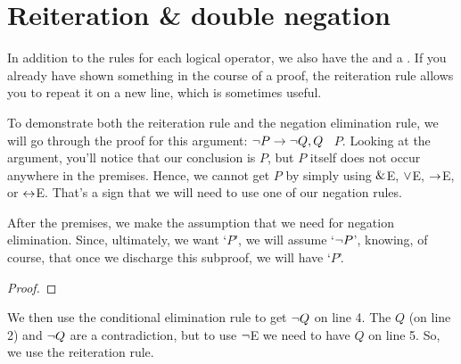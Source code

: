 

\section{Reiteration \& double negation}
In addition to the rules for each logical operator, we also have the  and a . If you already have shown something in the course of a proof, the reiteration rule allows you to repeat it on a new line, which is sometimes useful.  


To demonstrate both the reiteration rule and the negation elimination rule, we will go through the proof for this argument: ${\neg} P \rightarrow {\neg} Q, Q$ \therefore\ $P$. Looking at the argument, you'll notice that our conclusion is $P$, but $P$ itself does not occur anywhere in the premises. Hence, we cannot get $P$ by simply using $\mathbin{\&}$E, $\vee$E, $\rightarrow$E, or $\leftrightarrow$E. That's a sign that we will need to use one of our negation rules.

After the premises, we make the assumption that we need for negation elimination. Since, ultimately, we want `$P$', we will assume `${\neg} P$', knowing, of course, that once we discharge this subproof, we will have `$P$'.

\begin{proof}
	 	
	 
	\open
\end{proof}
We then use the conditional elimination rule to get ${\neg} Q$ on line 4. The $Q$ (on line 2) and ${\neg} Q$ are a contradiction, but to use ${\neg}$E we need to have $Q$ on line 5. So, we use the reiteration rule. 

